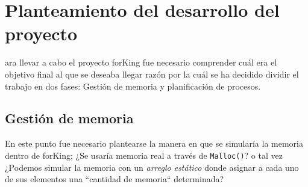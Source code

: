 \section{Planteamiento del desarrollo del proyecto}
ara llevar a cabo el proyecto forKing fue necesario comprender cuál era el objetivo final al que se deseaba llegar razón por la cuál se ha decidido dividir el trabajo en dos fases: Gestión de memoria y planificación de procesos.


\subsection{Gestión de memoria}
En este punto fue necesario plantearse la manera en que se simularía la memoria dentro de forKing; ¿Se usaría memoria real a través de \texttt{Malloc()}? o tal vez ¿Podemos simular la memoria con un \textit{arreglo estático} donde asignar a cada uno de sus elementos una ``cantidad de memoria`` determinada?

